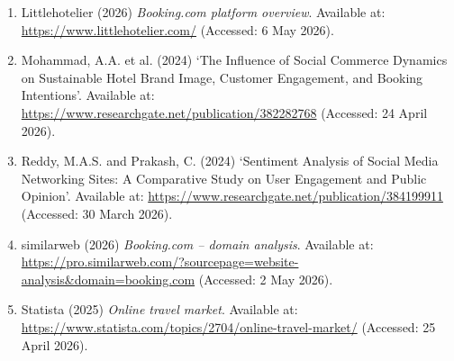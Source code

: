 \documentclass[12pt,a4paper]{article}
\begin{document}
\begin{enumerate}[leftmargin=1.5em]
    \item Littlehotelier (2026) \textit{Booking.com platform overview}. Available at: \url{https://www.littlehotelier.com/} (Accessed: 6 May 2026).
    \item Mohammad, A.A. et al. (2024) `The Influence of Social Commerce Dynamics on Sustainable Hotel Brand Image, Customer Engagement, and Booking Intentions'. Available at: \url{https://www.researchgate.net/publication/382282768} (Accessed: 24 April 2026).
    \item Reddy, M.A.S. and Prakash, C. (2024) `Sentiment Analysis of Social Media Networking Sites: A Comparative Study on User Engagement and Public Opinion'. Available at: \url{https://www.researchgate.net/publication/384199911} (Accessed: 30 March 2026).
    \item similarweb (2026) \textit{Booking.com -- domain analysis}. Available at: \url{https://pro.similarweb.com/?sourcepage=website-analysis&domain=booking.com} (Accessed: 2 May 2026).
    \item Statista (2025) \textit{Online travel market}. Available at: \url{https://www.statista.com/topics/2704/online-travel-market/} (Accessed: 25 April 2026).
\end{enumerate}
\end{document}
